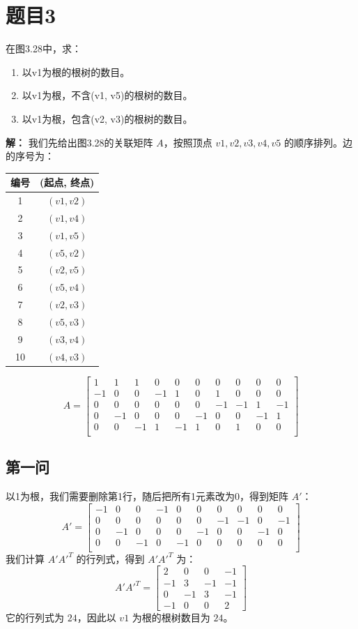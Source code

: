 \documentclass[utf8]{ctexart}
\theoremstyle{mystyle}
\begin{document}
\section*{题目3}
\begin{problembox}
在图3.28中，求：
\begin{enumerate}
    \item 以v1为根的根树的数目。
    \item 以v1为根，不含(v1, v5)的根树的数目。
    \item 以v1为根，包含(v2, v3)的根树的数目。
\end{enumerate}
\end{problembox}
\textbf{解：} 我们先给出图3.28的关联矩阵 $A$，按照顶点 $v1, v2, v3, v4, v5$ 的顺序排列。边的序号为：
\begin{center}

\begin{tabular}{|c|c|}
\hline
编号 & (起点, 终点) \\
\hline
1 & $(v1, v2)$ \\
2 & $(v1, v4)$ \\
3 & $(v1, v5)$ \\
4 & $(v5, v2)$ \\
5 & $(v2, v5)$ \\
6 & $(v5, v4)$ \\
7 & $(v2, v3)$ \\
8 & $(v5, v3)$ \\
9 & $(v3, v4)$ \\
10 & $(v4, v3)$ \\
\hline
\end{tabular}
\end{center}

\[
A = \begin{bmatrix}
1 & 1 & 1 & 0 & 0 & 0 & 0 & 0 & 0 & 0 \\
-1 & 0 & 0 & -1 & 1 & 0 & 1 & 0 & 0 & 0 \\
0 & 0 & 0 & 0 & 0 & 0 & -1 & -1 & 1 & -1 \\
0 & -1 & 0 & 0 & 0 & -1 & 0 & 0 & -1 & 1 \\
0 & 0 & -1 & 1 & -1 & 1 & 0 & 1 & 0 & 0 \\
\end{bmatrix}
\]
\subsection*{第一问}
以1为根，我们需要删除第1行，随后把所有1元素改为0，得到矩阵 $A'$：
\[
A' = \begin{bmatrix}
-1 & 0 & 0 & -1 & 0 & 0 & 0 & 0 & 0 & 0 \\
0 & 0 & 0 & 0 & 0 & 0 & -1 & -1 & 0 & -1 \\
0 & -1 & 0 & 0 & 0 & -1 & 0 & 0 & -1 & 0 \\
0 & 0 & -1 & 0 & -1 & 0 & 0 & 0 & 0 & 0 \\
\end{bmatrix}
\]
我们计算 $A'A'^T$ 的行列式，得到 $A'A'^T$ 为：
\[
A'A'^T = \begin{bmatrix}
2 & 0 & 0 & -1 \\
-1 & 3 & -1 & -1 \\
0 & -1 & 3 & -1 \\
-1 & 0 & 0 & 2
\end{bmatrix}
\]
它的行列式为 $24$，因此以 $v1$ 为根的根树数目为 $24$。
\end{document}
